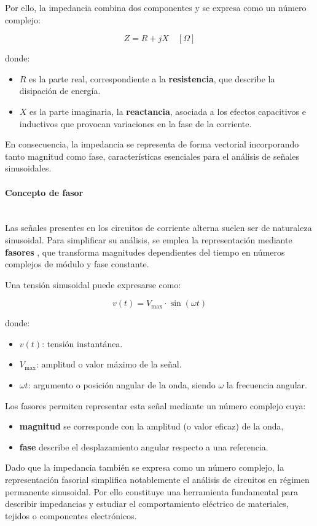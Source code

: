 \documentclass[11pt,a4paper]{article}
\newcommand{\myparagraph}[1]{\paragraph{#1}\mbox{}\\}
\begin{document}
Por ello, la impedancia combina dos componentes y se expresa como un número complejo:

\[
Z = R + jX \quad [\Omega]
\]

donde:
\begin{itemize}
    \item \(R\) es la parte real, correspondiente a la \textbf{resistencia}, que describe la disipación de energía.
    \item \(X\) es la parte imaginaria, la \textbf{reactancia}, asociada a los efectos capacitivos e inductivos que provocan variaciones en la fase de la corriente.
\end{itemize}

En consecuencia, la impedancia se representa de forma vectorial incorporando tanto magnitud como fase, características esenciales para el análisis de señales sinusoidales.

\myparagraph{Concepto de fasor}

Las señales presentes en los circuitos de corriente alterna suelen ser de naturaleza sinusoidal. Para simplificar su análisis, se emplea la representación mediante \textbf{fasores} \cite{oppenheim2010}, que transforma magnitudes dependientes del tiempo en números complejos de módulo y fase constante.

Una tensión sinusoidal puede expresarse como:

\[
v(t) = V_{\text{max}} \cdot \sin(\omega t)
\]

donde:
\begin{itemize}
    \item \(v(t)\): tensión instantánea.
    \item \(V_{\text{max}}\): amplitud o valor máximo de la señal.
    \item \(\omega t\): argumento o posición angular de la onda, siendo \(\omega\) la frecuencia angular.
\end{itemize}

Los fasores permiten representar esta señal mediante un número complejo cuya:
\begin{itemize}
    \item \textbf{magnitud} se corresponde con la amplitud (o valor eficaz) de la onda,
    \item \textbf{fase} describe el desplazamiento angular respecto a una referencia.
\end{itemize}

Dado que la impedancia también se expresa como un número complejo, la representación fasorial simplifica notablemente el análisis de circuitos en régimen permanente sinusoidal. Por ello constituye una herramienta fundamental para describir impedancias y estudiar el comportamiento eléctrico de materiales, tejidos o componentes electrónicos.
\end{document}
